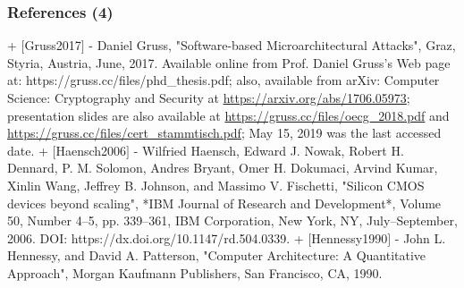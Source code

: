 \documentclass[xcolor={usenames,dvipsnames},hyperref={hyperindex,bookmarks}]{beamer}
\begin{document}
\begin{frame}
	\frametitle{References (4)}

+ $[$Gruss2017$]$
	- Daniel Gruss, "Software-based Microarchitectural Attacks", Graz, Styria, Austria, June, 2017. Available online from Prof. Daniel Gruss's Web page at: https://gruss.cc/files/phd_thesis.pdf; also, available from arXiv: Computer Science: Cryptography and Security at \url{https://arxiv.org/abs/1706.05973}; presentation slides are also available at \url{https://gruss.cc/files/oecg_2018.pdf} and \url{https://gruss.cc/files/cert_stammtisch.pdf}; May 15, 2019 was the last accessed date.
+ $[$Haensch2006$]$
	- Wilfried Haensch, Edward J. Nowak, Robert H. Dennard, P. M. Solomon, Andres Bryant, Omer H. Dokumaci, Arvind Kumar, Xinlin Wang, Jeffrey B. Johnson, and Massimo V. Fischetti, "Silicon {CMOS} devices beyond scaling", *{IBM} Journal of Research and Development*, Volume 50, Number 4--5, pp. 339--361, {IBM} Corporation, New York, {NY}, July--September, 2006. DOI: https://dx.doi.org/10.1147/rd.504.0339.
+ $[$Hennessy1990$]$
	- John L. Hennessy, and David A. Patterson, "Computer Architecture: A Quantitative Approach", Morgan Kaufmann Publishers, San Francisco, {CA}, 1990.



\end{frame}
\end{document}
